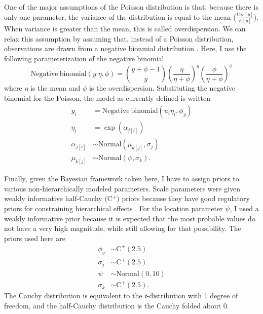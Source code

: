 \documentclass[12pt,letterpaper]{article}
\begin{document}
One of the major assumptions of the Poisson distribution is that, because there is only one parameter, the variance of the distribution is equal to the mean (\(\frac{Var[y]}{E[y]}\)). When variance is greater than the mean, this is called overdispersion. We can relax this assumption by assuming that, instead of a Poisson distribution, observations are drawn from a negative bionmial distribution \citep{Gelman2007}. Here, I use the following parameterization of the negative binomial 
\begin{equation}
  \mathrm{Negative\ binomial}(y | \eta, \phi) = {y + \phi -1 \choose y} \left(\frac{\eta}{\eta + \phi}\right)^{y} \left(\frac{\phi}{\eta + \phi}\right)^{\phi}
  \label{eq:neg_bin}
\end{equation}
where \(\eta\) is the mean and \(\phi\) is the overdispersion. Substituting the negative binomial for the Poisson, the model as currently defined is written
\begin{align}
  y_{i} &= \mathrm{Negative\ binomial}(u_{i}\eta_{i}, \phi_{y}) \nonumber \\
  \eta_{i} &= \exp(\alpha_{j[i]}) \nonumber \\
  \alpha_{j[i]} &\sim \mathrm{Normal}(\mu_{k[j]}, \sigma_{j}) \nonumber \\
  \mu_{k[j]} &\sim \mathrm{Normal}(\psi, \sigma_{k}).
  \label{eq:nb_mod}
\end{align}







Finally, given the Bayesian framework taken here, I have to assign priors to various non-hierarchically modeled parameters. Scale parameters were given weakly informative half-Cauchy (C\(^{+}\)) priors because they have good regulatory priors for constraining hierarchical effects \citep{Gelman2006,Gelman2013b}. For the location parameter \(\psi\), I used a weakly informative prior because it is expected that the most probable values do not have a very high magnitude, while still allowing for that possibility. The priors used here are
\begin{align*}
  \phi_{y} &\sim \mathrm{C}^{+}(2.5) \\
  \sigma_{j} &\sim \mathrm{C}^{+}(2.5) \\
  \psi &\sim \mathrm{Normal}(0, 10) \\
  \sigma_{k} &\sim \mathrm{C}^{+}(2.5).
\end{align*}
The Cauchy distribution is equivalent to the \textit{t}-distribution with 1 degree of freedom, and the half-Cauchy distribution is the Cauchy folded about 0.
\end{document}
